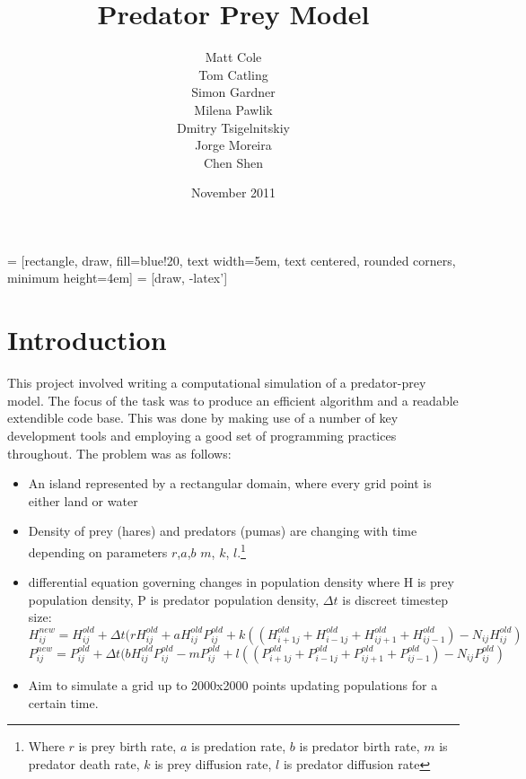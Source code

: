 \documentclass[11pt]{report}
\title{Predator Prey Model\let\thefootnote\relax\footnotetext{When writing this report, a lot of emphasis was put on interactivity, so, a reader would benefit from reading an electronic version (PDF) rather than a paper one}}
\author{Matt Cole\\ Tom Catling\\ Simon Gardner\\ Milena Pawlik\\ Dmitry Tsigelnitskiy\\ Jorge Moreira\\ Chen Shen}
\date{November 2011}
\begin{document}
\usetikzlibrary{shapes,arrows}


 = [rectangle, draw, fill=blue!20, 
    text width=5em, text centered, rounded corners, minimum height=4em]
 = [draw, -latex']

\maketitle



\tableofcontents
\thispagestyle{empty}

\chapter{Introduction}
\setcounter{page}{1}

This project involved writing a computational simulation of a predator-prey model. The focus of the task was to produce an efficient algorithm and a readable extendible code base. This was  done by making use of a number of key development tools and employing a good set of programming practices throughout. The problem was as follows:
\begin{itemize}
\item An island represented by a rectangular domain, where every grid point is either land or water
\item Density of prey (hares) and predators (pumas) are changing with time depending on parameters $r$,$a$,$b$ $m$, $k$, $l$.\footnote{Where $r$ is prey birth rate, $a$ is predation rate, $b$ is predator birth rate, $m$ is predator death rate, $k$ is prey diffusion rate, $l$ is predator diffusion rate}
\item differential equation governing changes in population density where H is prey population density, P is predator population density, ${\Delta}t$ is discreet timestep size:
\begin{equation*}
H_{ij}^{new}=H_{ij}^{old} + {\Delta}t(rH_{ij}^{old}+aH_{ij}^{old}P_{ij}^{old} + k((H_{i+1j}^{old} + H_{i-1j}^{old} + H_{ij+1}^{old} + H_{ij-1}^{old})-N_{ij}H_{ij}^{old})
\end{equation*}
\begin{equation*}
P_{ij}^{new}=P_{ij}^{old} + {\Delta}t(bH_{ij}^{old}P_{ij}^{old}-mP_{ij}^{old} + l((P_{i+1j}^{old} + P_{i-1j}^{old} + P_{ij+1}^{old} + P_{ij-1}^{old})-N_{ij}P_{ij}^{old})
\end{equation*}

\item Aim to simulate a grid up to 2000x2000 points updating populations for a certain time.
\end{itemize}
\end{document}
